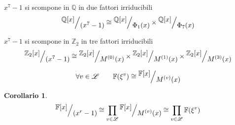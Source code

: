 \documentclass[mathserif]{beamer}
\def\quotient#1#2{%
   \raise1ex\hbox{$#1$}\Big/\lower1ex\hbox{$#2$}%
}
\newtheorem{corollario}{Corollario}
\begin{document}
\thispagestyle{empty}
\begin{frame}
   \vspace{-1.5cm}
        \begin{center}
         $x^7 - 1$ si scompone in $ \mathbb{Q} $ in due fattori irriducibili
	\begin{align*}
	  \quotient{\mathbb{Q} \lbrack x \rbrack  }{(x^{7} - 1)}
	  \cong
	  \quotient{\mathbb{Q} \lbrack x \rbrack  }{\Phi_{1}(x)}
	  \times
	  \quotient{\mathbb{Q} \lbrack x \rbrack  }{\Phi_{7}(x)}
	\end{align*}
	\vspace{1cm}

	 $x^7 - 1$ si scompone in $ \mathbb{Z}_{2}$ in tre fattori irriducibili
	\begin{align*}
	  \quotient{\mathbb{Z}_{2} \lbrack x \rbrack  }{(x^{7} - 1)}
	  \cong
	  \quotient{\mathbb{Z}_{2} \lbrack x \rbrack  }{M^{(0)}(x)}
	  \times
	  \quotient{\mathbb{Z}_{2} \lbrack x \rbrack  }{M^{(1)}(x)}
	  \times
	  \quotient{\mathbb{Z}_{2} \lbrack x \rbrack  }{M^{(3)}(x)}
	\end{align*}
	\end{center}
\end{frame}

\begin{frame}
   \begin{lemma}
   \begin{align*}
      \forall v \in \mathscr{L}
      \qquad
      \mathbb{F}(\xi^{v})
      \cong
      \quotient{\mathbb{F} \lbrack x \rbrack  }{M^{(v)}(x)}
   \end{align*}
  \end{lemma}
  \begin{corollario}
     \begin{align*}
        \quotient{\mathbb{F} \lbrack x \rbrack  }{ (x^{r} - 1)}
         \cong
         \prod_{v\in \mathscr{L}} \quotient{\mathbb{F} \lbrack x \rbrack  }{M^{(v)}(x)}
         \cong
         \prod_{v\in \mathscr{L}} \mathbb{F}(\xi^{v})
     \end{align*}
  \end{corollario}

\end{frame}
\end{document}
